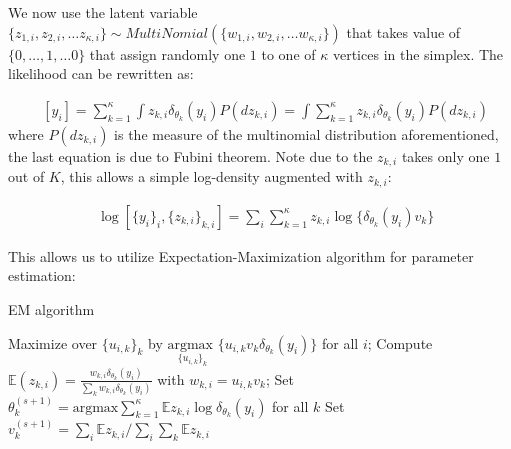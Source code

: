 \documentclass[12pt]{article}
\begin{document}
We now use the latent variable $\{ z_{1,i},z_{2,i},\ldots z_{\kappa,i} \} \sim MultiNomial (\{ w_{1,i},w_{2,i},\ldots w_{\kappa,i}\} )$ that takes value of $\{0,\ldots,1,\ldots 0\}$ that assign randomly one $1$ to one of $\kappa$ vertices in the simplex. The likelihood can be rewritten as:


\begin{equation}
\begin{aligned}
& [ y_i ] =   \sum_{k=1}^{\kappa} \int z_{k,i} \delta_{\theta_{k}}(y_i) P(d z_{k,i}) = \int \sum_{k=1}^{\kappa} z_{k,i} \delta_{\theta_{k}}(y_i) P(d z_{k,i})
\end{aligned}
\end{equation}
where $P(d z_{k,i})$ is the measure of the multinomial distribution aforementioned, the last equation is due to Fubini theorem. Note due to the $z_{k,i}$ takes only one $1$ out of $K$, this allows a simple log-density augmented with $z_{k,i}$:

\begin{equation}
\begin{aligned}
& \log[ \{y_i\}_i, \{z_{k,i}\}_{k,i} ] =  \sum_{i}\sum_{k=1}^{\kappa} z_{k,i} \log \{\delta_{\theta_{k}}(y_i) v_k \}
\end{aligned}
\label{conditional_lik}
\end{equation}

 This allows us to utilize Expectation-Maximization algorithm for parameter estimation:

\begin{algorithm}[H]
\caption{EM algorithm}\label{alg:euclid}
\begin{algorithmic}[1]
\State Maximize over $\{ u_{i,k}\}_k$ by $ \underset{\{u_{i,k}\}_k} {\text{argmax }}\{u_{i,k}  v_{k}\delta_{\theta_{k}}(y_i)\}$ for all $i$; 
\State Compute $ \mathbb{E}(z_{k,i})= \frac{w_{k,i} \delta_{\theta_{k}}(y_i)}{\sum_k w_{k,i} \delta_{\theta_{k}}(y_i)}$ with $w_{k,i} = u_{i,k} v_{k}$; 
\State Set $\theta^{(s+1)}_{k}= \text{argmax} \sum_{k=1}^{\kappa} \mathbb{E}z_{k,i} \log \delta_{\theta_{k}}(y_i) $ for all $k$ 
\State Set $v^{(s+1)}_{k}=  \sum_{i}\mathbb{E}z_{k,i} /  \sum_{i}\sum_{k}\mathbb{E}z_{k,i}$ \label{flex_w_step}
\EndWhile
\end{algorithmic}
\end{algorithm}
\end{document}
